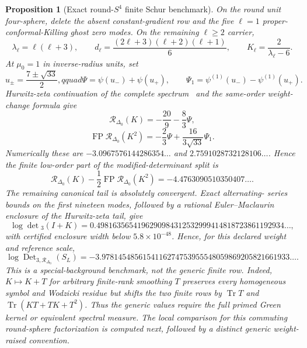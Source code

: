\documentclass[11pt]{article}
\newtheorem{proposition}[theorem]{Proposition}
\theoremstyle{definition}
\theoremstyle{remark}
\begin{document}
\begin{proposition}[Exact round-$S^4$ finite Schur benchmark]
On the round unit four-sphere, delete the absent constant-gradient row and
the five $\ell=1$ proper-conformal-Killing ghost zero modes.  On the remaining
$\ell\geq2$ carrier,
\[
 \lambda_\ell=\ell(\ell+3),\qquad
 d_\ell=\frac{(2\ell+3)(\ell+2)(\ell+1)}6,
 \qquad K_\ell=\frac2{\lambda_\ell-6}.
\]
At $\mu_0=1$ in inverse-radius units, set
\[
 u_\pm=\frac{7\pm\sqrt{33}}2,qquad
 \Psi=\psi(u_-)+\psi(u_+),\qquad
 \Psi_1=\psi^{(1)}(u_-)-\psi^{(1)}(u_+).
\]
Hurwitz-zeta continuation of the complete spectrum~\cite{SpreaficoZerbini}
and the same-order weight-change formula give
\[
 \boxed{\mathcal R_{\Delta_0}(K)=-\frac{20}{9}-\frac83\Psi,}
\]
\[
 \boxed{
 \operatorname{FP}\mathcal R_{\Delta_0}(K^2)
 =-\frac23\Psi+\frac{16}{3\sqrt{33}}\Psi_1.}
\]
Numerically these are $-3.0967576144286354\ldots$ and
$2.7591028732128106\ldots$.  Hence the finite low-order part of the
modified-determinant split is
\[
 \mathcal R_{\Delta_0}(K)
 -\frac12\operatorname{FP}\mathcal R_{\Delta_0}(K^2)
 =-4.4763090510350407\ldots.
\]
The remaining canonical tail is absolutely convergent.  Exact alternating-
series bounds on the first nineteen modes, followed by a rational
Euler--Maclaurin enclosure of the Hurwitz-zeta tail, give
\[
 \boxed{
 \log\det{}_3(I+K)
 =0.4981635654196290984312532999414818723861192934\ldots,}
\]
with certified enclosure width below $5.8\times10^{-48}$.  Hence, for this
declared weight and reference scale,
\[
 \boxed{
 \log\operatorname{Det}_{3,\mathcal R_{\Delta_0}}(S_L)
 =-3.9781454856154116274753955548059869205821661933\ldots.}
\]
This is a special-background benchmark, not the generic finite row.  Indeed,
$K\mapsto K+T$ for arbitrary finite-rank smoothing $T$ preserves every
homogeneous symbol and Wodzicki residue but shifts the two finite rows by
$\operatorname{Tr}T$ and
$\operatorname{Tr}(KT+TK+T^2)$.  Thus the generic values require the full
primed Green kernel or equivalent spectral measure.  The local comparison for
this commuting round-sphere factorization is computed next, followed by a
distinct generic weight-raised convention.
\end{proposition}
\end{document}
